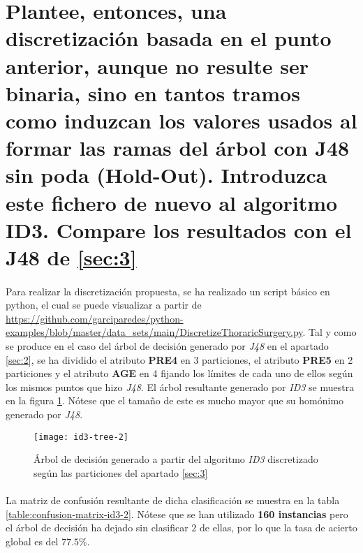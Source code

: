 \documentclass[10pt, a4paper,spanish]{article}
\begin{document}
	\section{Plantee, entonces, una discretización basada en el punto anterior, aunque no resulte ser binaria, sino en tantos tramos como induzcan los valores usados al formar las ramas del árbol con J48 sin poda (Hold-Out). Introduzca este fichero de nuevo al algoritmo ID3. Compare los resultados con el J48 de \ref{sec:3}}
	\label{sec:5}

		\paragraph{}
		Para realizar la discretización propuesta, se ha realizado un script básico en python, el cual se puede visualizar a partir de \url{https://github.com/garciparedes/python-examples/blob/master/data_sets/main/DiscretizeThoraricSurgery.py}\cite{github:garciparedes-python-examples}. Tal y como se produce en el caso del árbol de decisión generado por \emph{J48} en el apartado \ref{sec:2}, se ha dividido el atributo \textbf{PRE4} en 3 particiones, el atributo \textbf{PRE5} en 2 particiones y el atributo \textbf{AGE} en 4 fijando los límites de cada uno de ellos según los mismos puntos que hizo \emph{J48}. El árbol resultante generado por \emph{ID3} se muestra en la figura \ref{fig:id3-tree-2}. Nótese que el tamaño de este es mucho mayor que su homónimo generado por \emph{J48}.

		\begin{figure}[h]
			\begin{center}
				\texttt{[image: id3-tree-2]}
			\end{center}
			\caption{Árbol de decisión generado a partir del algoritmo \emph{ID3} discretizado según las particiones del apartado \ref{sec:3}}
			\label{fig:id3-tree-2}
		\end{figure}

		\paragraph{}
		La matriz de confusión resultante de dicha clasificación se muestra en la tabla \ref{table:confusion-matrix-id3-2}. Nótese que se han utilizado \textbf{160 instancias} pero el árbol de decisión ha dejado sin clasificar $2$ de ellas, por lo que la tasa de acierto global es del $77.5\%$.
\end{document}
